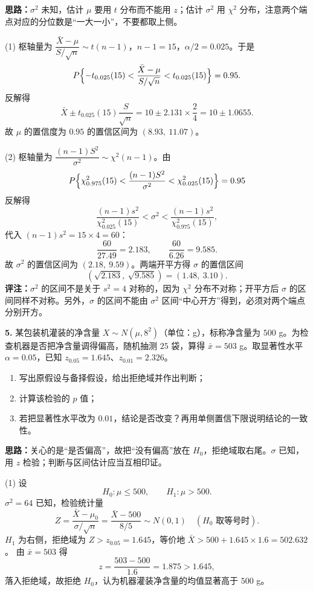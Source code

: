 \ifshowsolutions%
\textbf{思路：}$\sigma^{2}$ 未知，估计 $\mu$ 要用 $t$ 分布而不能用 $z$；估计 $\sigma^{2}$ 用 $\chi^{2}$ 分布，注意两个端点对应的分位数是“一大一小”，不要都取上侧。

(1) 枢轴量为 $\dfrac{\bar X-\mu}{S/\sqrt{n}}\sim t(n-1)$，$n-1=15$，$\alpha/2=0.025$。于是
\[
P\Bigl\{-t_{0.025}(15)<\frac{\bar X-\mu}{S/\sqrt{n}}<t_{0.025}(15)\Bigr\}=0.95 .
\]
反解得
\[
\bar X\pm t_{0.025}(15)\frac{S}{\sqrt{n}}
=10\pm2.131\times\frac{2}{4}
=10\pm1.0655 .
\]
故 $\mu$ 的置信度为 $0.95$ 的置信区间为 $(8.93,\ 11.07)$。

(2) 枢轴量为 $\dfrac{(n-1)S^{2}}{\sigma^{2}}\sim\chi^{2}(n-1)$。由
\[
P\Bigl\{\chi^{2}_{0.975}(15)<\frac{(n-1)S^{2}}{\sigma^{2}}<\chi^{2}_{0.025}(15)\Bigr\}=0.95
\]
反解得
\[
\frac{(n-1)s^{2}}{\chi^{2}_{0.025}(15)}<\sigma^{2}<\frac{(n-1)s^{2}}{\chi^{2}_{0.975}(15)},
\]
代入 $(n-1)s^{2}=15\times4=60$：
\[
\frac{60}{27.49}=2.183,\qquad \frac{60}{6.26}=9.585 .
\]
故 $\sigma^{2}$ 的置信区间为 $(2.18,\ 9.59)$。两端开平方得 $\sigma$ 的置信区间
\[
(\sqrt{2.183},\ \sqrt{9.585})=(1.48,\ 3.10).
\]
\textbf{评注：}$\sigma^{2}$ 的区间不是关于 $s^{2}=4$ 对称的，因为 $\chi^{2}$ 分布不对称；开平方后 $\sigma$ 的区间同样不对称。另外，$\sigma$ 的区间不能由 $\sigma^{2}$ 区间“中心开方”得到，必须对两个端点分别开方。


\else \answerarea[10] \fi%
\textbf{5.} 某包装机灌装的净含量 $X\sim N(\mu,8^{2})$（单位：g），标称净含量为 $500$ g。为检查机器是否把净含量调得偏高，随机抽测 $25$ 袋，算得 $\bar x=503$ g。取显著性水平 $\alpha=0.05$，已知 $z_{0.05}=1.645$、$z_{0.01}=2.326$。
\begin{enumerate}[label=(\arabic*)]
    \item 写出原假设与备择假设，给出拒绝域并作出判断；
    \item 计算该检验的 $p$ 值；
    \item 若把显著性水平改为 $0.01$，结论是否改变？再用单侧置信下限说明结论的一致性。
\end{enumerate}

\ifshowsolutions%
\textbf{思路：}关心的是“是否偏高”，故把“没有偏高”放在 $H_0$，拒绝域取右尾。$\sigma$ 已知，用 $z$ 检验；判断与区间估计应当互相印证。

(1) 设
\[
H_0:\mu\leqslant500,\qquad H_1:\mu>500 .
\]
$\sigma^{2}=64$ 已知，检验统计量
\[
Z=\frac{\bar X-\mu_0}{\sigma/\sqrt{n}}=\frac{\bar X-500}{8/5}\sim N(0,1)\quad(H_0\text{ 取等号时}).
\]
$H_1$ 为右侧，拒绝域为 $Z>z_{0.05}=1.645$，等价地 $\bar X>500+1.645\times1.6=502.632$。
由 $\bar x=503$ 得
\[
z=\frac{503-500}{1.6}=1.875>1.645 ,
\]
落入拒绝域，故拒绝 $H_0$，认为机器灌装净含量的均值显著高于 $500$ g。

